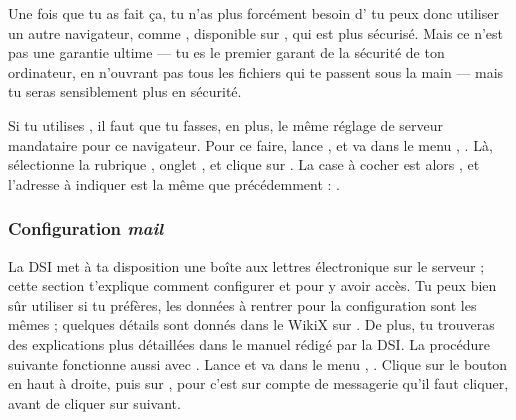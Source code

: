 Une fois que tu as fait \c{c}a, tu n'as plus forcément besoin d' tu peux donc utiliser un autre navigateur, comme , disponible sur \xshare, qui est plus sécurisé. Mais ce n'est pas une garantie ultime --- tu es le premier garant de la sécurité de ton
ordinateur, en n'ouvrant pas tous les fichiers qui te passent sous la main
--- mais tu seras sensiblement plus en sécurité.



Si tu utilises , il faut que tu fasses, en plus, le même réglage de serveur mandataire pour
ce navigateur. Pour ce faire, lance , et va dans le menu ,
. Là, sélectionne la rubrique , onglet , et clique sur
. La case à cocher est alors ,
et l'adresse à indiquer est la même que précédemment : .

%



\subsubsection{Configuration \emph{mail}}

 La DSI met à ta disposition une bo\^{i}te aux lettres électronique sur
le serveur  ; cette section t'explique comment
configurer  et  pour y avoir accès. Tu peux bien
s\^{u}r utiliser  si tu préfères, les données à rentrer
pour la configuration sont les mêmes ; quelques détails sont donnés
dans le WikiX sur \fkz. De plus, tu trouveras des explications plus
détaillées dans le manuel rédigé par la DSI.
La procédure suivante fonctionne aussi avec .
Lance  et va dans le menu ,
. Clique sur le bouton  en
haut à droite, puis sur , pour  c'est sur compte de messagerie qu'il faut cliquer, avant de cliquer sur suivant.



